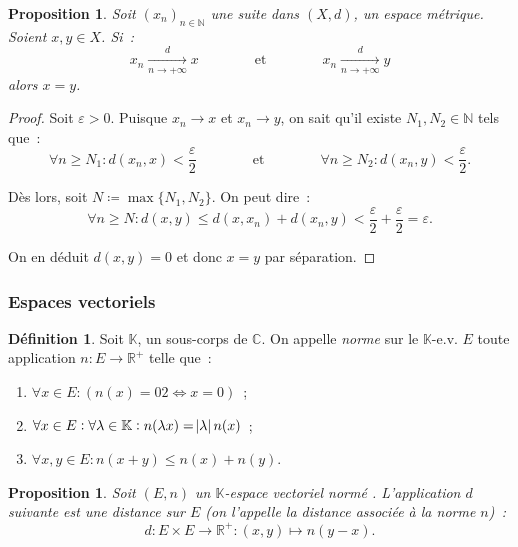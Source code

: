 \documentclass{report}
\newtheorem{prp}[thm]{Proposition}
\theoremstyle{definition}
\newtheorem{déf}[thm]{Définition}
\theoremstyle{remark}
\numberwithin{equation}{section}
\newcommand{\K}{\mathbb K}
\newcommand{\C}{\mathbb C}
\newcommand{\R}{\mathbb R}
\newcommand{\Rp}{\R^{+}}
\newcommand{\N}{\mathbb N}
\newcommand{\seq}[3]{\left(#1_{#2}\right)_{#2 \in #3}}
\newcommand{\mconv}[3]{\xrightarrow[#1 \to #2]{#3}}
\newcommand{\pinfty}{{+\infty}}
\newcommand{\evn}{espace vectoriel normé }
\begin{document}
				\begin{prp} Soit $\seq xn\N$ une suite dans $(X, d)$, un espace métrique. Soient $x, y \in X$. Si~:
				\[x_n \mconv n\pinfty d x \qquad\qquad \text{et} \qquad\qquad x_n \mconv n\pinfty d y\]
				alors $x = y$. \end{prp}

				\begin{proof} Soit $\varepsilon > 0$. Puisque $x_n \to x$ et $x_n \to y$, on sait qu'il existe $N_1, N_2 \in \N$ tels que~:
				\[\forall n \geq N_1 : d(x_n, x) < \frac \varepsilon2 \qquad\qquad \text{et} \qquad\qquad \forall n \geq N_2 : d(x_n, y) < \frac \varepsilon2.\]

				Dès lors, soit $N \coloneqq \max\{N_1, N_2\}$. On peut dire~:
				\begin{equation}
					\forall n \geq N : d(x, y) \leq d(x, x_n) + d(x_n, y) < \frac \varepsilon2 + \frac \varepsilon2 = \varepsilon.
				\end{equation}

				On en déduit $d(x, y) = 0$ et donc $x = y$ par séparation. \end{proof}

			\subsubsection{Espaces vectoriels}
				\begin{déf} Soit $\K$, un sous-corps de $\C$. On appelle \textit{norme} sur le $\K$-e.v. $E$ toute application $n : E \to \Rp$ telle que~:

				\begin{enumerate}
					\item $\forall x \in E : \left(n(x) = 02 \iff x = 0\right)$~;
					\item $\forall x \in E : \forall \lambda \in \K : n(\lambda x) = \abs \lambda n(x)$~;
					\item $\forall x, y \in E : n(x + y) \leq n(x) + n(y)$.
				\end{enumerate}
				\end{déf}

				\begin{prp} Soit $(E, n)$ un $\K$-\evn. L'application $d$ suivante est une distance sur $E$ (on l'appelle la
				\textit{distance associée à la norme $n$})~:
				\begin{equation}
					d : E \times E \to \Rp : (x, y) \mapsto n(y-x).
				\end{equation}
				\end{prp}
\end{document}

